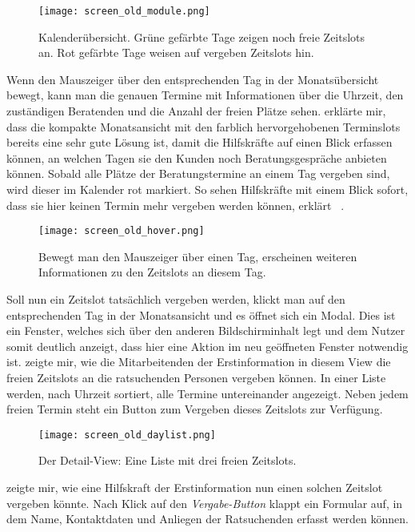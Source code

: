 \begin{figure}[H]
    \caption{Kalenderübersicht. Grüne gefärbte Tage zeigen noch freie Zeitslots an. Rot gefärbte Tage weisen auf vergeben Zeitslots hin.}
    \centering
    \texttt{[image: screen\_old\_module.png]}
\end{figure}

Wenn \ipName den Mauszeiger über den entsprechenden Tag in der Monatsübersicht
bewegt, kann man die genauen Termine mit Informationen über die Uhrzeit, den
zuständigen Beratenden und die Anzahl der freien Plätze sehen. \ipName erklärte
mir, dass die kompakte Monatsansicht mit den farblich hervorgehobenen
Terminslots bereits eine sehr gute Lösung ist, damit die Hilfskräfte auf einen
Blick erfassen können, an welchen Tagen sie den Kunden noch Beratungsgespräche
anbieten können. Sobald alle Plätze der Beratungstermine an einem Tag vergeben
sind, wird dieser im Kalender rot markiert. \glqq{}So sehen Hilfskräfte mit
einem Blick sofort, dass sie hier keinen Termin mehr vergeben werden
können\grqq{}, erklärt \ipName ~\cite{claves}.

\begin{figure}[H]
    \caption{Bewegt man den Mauszeiger über einen Tag, erscheinen weiteren Informationen zu den Zeitslots an diesem Tag.}
    \centering
    \texttt{[image: screen\_old\_hover.png]}
\end{figure}

Soll nun ein Zeitslot tatsächlich vergeben werden, klickt man auf den
entsprechenden Tag in der Monatsansicht und es öffnet sich ein \gls{Modal}.
Dies ist ein Fenster, welches sich über den anderen Bildschirminhalt legt und
dem Nutzer somit deutlich anzeigt, dass hier eine Aktion im neu geöffneten
Fenster notwendig ist. \ipName zeigte mir, wie die Mitarbeitenden der
Erstinformation in diesem \gls{View} die freien Zeitslots an die ratsuchenden
Personen vergeben können. In einer Liste werden, nach Uhrzeit sortiert, alle
Termine untereinander angezeigt. Neben jedem freien Termin steht ein Button zum
Vergeben dieses Zeitslots zur Verfügung.

\begin{figure}[H]
    \caption{Der Detail-View: Eine Liste mit drei freien Zeitslots.}
    \centering
    \texttt{[image: screen\_old\_daylist.png]}
\end{figure}

\ipName zeigte mir, wie eine Hilfskraft der Erstinformation nun einen solchen
Zeitslot vergeben könnte. Nach Klick auf den \textit{Vergabe-Button} klappt ein
Formular auf, in dem Name, Kontaktdaten und Anliegen der Ratsuchenden erfasst
werden können.

